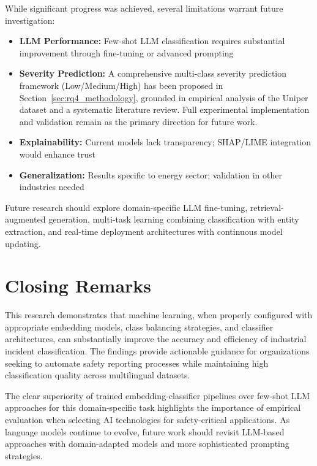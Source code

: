 \documentclass[11pt, titlepage, bibliography=totoc]{scrreprt}
\begin{document}
While significant progress was achieved, several limitations warrant future investigation:

\begin{itemize}
    \item \textbf{LLM Performance:} Few-shot LLM classification requires substantial improvement through fine-tuning or advanced prompting
    \item \textbf{Severity Prediction:} A comprehensive multi-class severity prediction framework (Low/Medium/High) has been proposed in Section~\ref{sec:rq4_methodology}, grounded in empirical analysis of the Uniper dataset and a systematic literature review. Full experimental implementation and validation remain as the primary direction for future work.
    \item \textbf{Explainability:} Current models lack transparency; SHAP/LIME integration would enhance trust
    \item \textbf{Generalization:} Results specific to energy sector; validation in other industries needed
\end{itemize}

Future research should explore domain-specific LLM fine-tuning, retrieval-augmented generation, multi-task learning combining classification with entity extraction, and real-time deployment architectures with continuous model updating.

\section{Closing Remarks}

This research demonstrates that machine learning, when properly configured with appropriate embedding models, class balancing strategies, and classifier architectures, can substantially improve the accuracy and efficiency of industrial incident classification. The findings provide actionable guidance for organizations seeking to automate safety reporting processes while maintaining high classification quality across multilingual datasets.

The clear superiority of trained embedding-classifier pipelines over few-shot LLM approaches for this domain-specific task highlights the importance of empirical evaluation when selecting AI technologies for safety-critical applications. As language models continue to evolve, future work should revisit LLM-based approaches with domain-adapted models and more sophisticated prompting strategies.

\appendix
\end{document}
